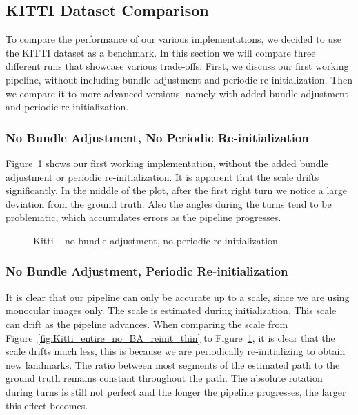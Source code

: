 \documentclass[11pt]{article}
\newlength\figureheight
\newlength\figurewidth
\begin{document}
\subsection{KITTI Dataset Comparison}
To compare the performance of our various implementations, we decided to use the KITTI dataset as a benchmark. In this section we will compare three different runs that showcase various trade-offs. First, we discuss our first working pipeline, without including bundle adjustment and periodic re-initialization. Then we compare it to more advanced versions, namely with added bundle adjustment and periodic re-initialization.

\subsubsection{No Bundle Adjustment, No Periodic Re-initialization}
Figure~\ref{fig:Kitti_entire_no_BA_no_reinit_thin} shows our first working implementation, without the added bundle adjustment or periodic re-initialization. It is apparent that the scale drifts significantly. In the middle of the plot, after the first right turn we notice a large deviation from the ground truth. Also the angles during the turns tend to be problematic, which accumulates errors as the pipeline progresses.

\begin{figure}[h]
	\centering
	\setlength\figureheight{8cm} 
	\setlength\figurewidth{11cm}
	
	\caption{Kitti -- no bundle adjustment, no periodic re-initialization}
	\label{fig:Kitti_entire_no_BA_no_reinit_thin}
\end{figure}

\subsubsection{No Bundle Adjustment, Periodic Re-initialization}
It is clear that our pipeline can only be accurate up to a scale, since we are using monocular images only. The scale is estimated during initialization. This scale can drift as the pipeline advances. When comparing the scale from Figure~\ref{fig:Kitti_entire_no_BA_reinit_thin} to Figure~\ref{fig:Kitti_entire_no_BA_no_reinit_thin}, it is clear that the scale drifts much less, this is because we are periodically re-initializing to obtain new landmarks. The ratio between most segments of the estimated path to the ground truth remains constant throughout the path. The absolute rotation during turns is still not perfect and the longer the pipeline progresses, the larger this effect becomes.
\end{document}
